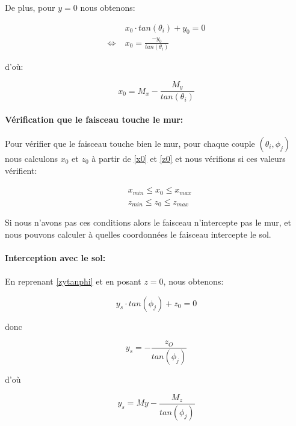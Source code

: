 \documentclass[12pt,a4paper]{report}
\begin{document}
De plus, pour $y=0$ nous obtenons:


\begin{align}
	& x_0 \cdot tan(\theta_i) + y_0 = 0 \\
	\Longleftrightarrow \; & x_0 = \frac{-y_0}{tan(\theta_i)} 
\end{align}

d'où:

\begin{equation}
		\label{x0}
		\boxed{
			x_0 = M_x - \frac{M_y}{tan(\theta_i)}
		}
\end{equation}

\paragraph{Vérification que le faisceau touche le mur:} Pour vérifier que le faisceau touche bien le mur, pour chaque couple $(\theta_i, \phi_j)$ nous calculons $x_0$ et $z_0$ à partir de \eqref{x0} et \eqref{z0} et nous vérifions si ces valeurs vérifient:

\begin{align*}
	&x_{min} \leq x_0 \leq x_{max} \\
	&z_{min} \leq z_0 \leq z_{max}
\end{align*}

Si nous n'avons pas ces conditions alors le faisceau n'intercepte pas le mur, et nous pouvons calculer à quelles coordonnées le faisceau intercepte le sol.

\paragraph{Interception avec le sol:}

\paragraph{} En reprenant \eqref{zytanphi} et en posant $z=0$, nous obtenons:

\begin{equation}
	y_s \cdot tan(\phi_j) + z_0 = 0
\end{equation}

donc

\begin{equation}
	y_s = - \frac{z_O}{tan(\phi_j)}
\end{equation}

d'où

\begin{equation}
	\boxed{
y_s = My - \frac{M_z}{tan(\phi_j)}	
}
\end{equation}
\end{document}
